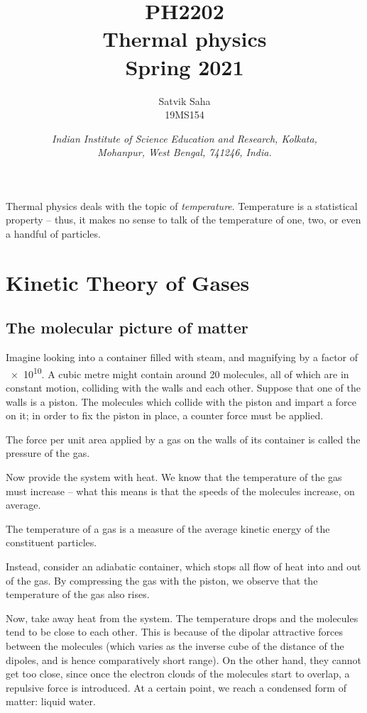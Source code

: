 \documentclass[11pt]{article}
\title{
    \Large\textsc{PH2202} \\
    \Huge \textbf{Thermal physics} \\
    \vspace{5pt}
    \Large{Spring 2021}
}
\author{
    \large Satvik Saha%
    \\\textsc{\small 19MS154}
}
\date{\normalsize
    \textit{Indian Institute of Science Education and Research, Kolkata, \\
    Mohanpur, West Bengal, 741246, India.} \\
}
\theoremstyle{definition}
\theoremstyle{remark}
\numberwithin{equation}{section}
\begin{document}
    \maketitle

    Thermal physics deals with the topic of \textit{temperature}.
    Temperature is a statistical property -- thus, it makes no sense to talk of the
    temperature of one, two, or even a handful of particles.

    \tableofcontents

    \section{Kinetic Theory of Gases}
    \subsection{The molecular picture of matter}
    Imagine looking into a container filled with steam, and magnifying by a factor
    of \num{e10}. A cubic metre might contain around \num{20} molecules, all of
    which are in constant motion, colliding with the walls and each other.
    Suppose that one of the walls is a piston. The molecules which collide with the
    piston and impart a force on it; in order to fix the piston in place, a
    counter force must be applied.
    \begin{definition}[Pressure]
        The force per unit area applied by a gas on the walls of its container is
        called the pressure of the gas.
    \end{definition}
    Now provide the system with heat. We know that the temperature of the gas must
    increase -- what this means is that the speeds of the molecules increase, on
    average.
    \begin{definition}[Temperature]
        The temperature of a gas is a measure of the average kinetic energy of the
        constituent particles.
    \end{definition}
    Instead, consider an adiabatic container, which stops all flow of heat into and
    out of the gas. By compressing the gas with the piston, we observe that the
    temperature of the gas also rises.

    Now, take away heat from the system. The temperature drops and the molecules
    tend to be close to each other. This is because of the dipolar attractive forces
    between the molecules (which varies as the inverse cube of the distance of the
    dipoles, and is hence comparatively short range).
    On the other hand, they cannot get too close, since once the electron clouds of
    the molecules start to overlap, a repulsive force is introduced. At a certain
    point, we reach a condensed form of matter: liquid water.
\end{document}
